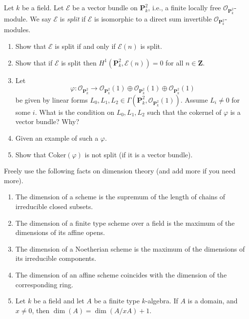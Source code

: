 \begin{exercise}
\label{exercise-nonsplit-vectorbundle}
Let $k$ be a field.
Let $\mathcal{E}$ be a vector bundle on $\mathbf{P}^2_k$, i.e., a finite locally
free $\mathcal{O}_{\mathbf{P}^2_k}$-module.
We say $\mathcal{E}$ is {\it split} if $\mathcal{E}$ is isomorphic to
a direct sum invertible $\mathcal{O}_{\mathbf{P}^2_k}$-modules.
\begin{enumerate}
\item Show that $\mathcal{E}$ is split if and only if $\mathcal{E}(n)$
is split.
\item Show that if $\mathcal{E}$ is split then
$H^1({\mathbf{P}^2_k}, \mathcal{E}(n)) = 0$
for all $n \in \mathbf{Z}$.
\item Let
$$
\varphi :
\mathcal{O}_{\mathbf{P}^2_k}
\longrightarrow
\mathcal{O}_{\mathbf{P}^2_k}(1) \oplus
\mathcal{O}_{\mathbf{P}^2_k}(1) \oplus
\mathcal{O}_{\mathbf{P}^2_k}(1)
$$
be given by linear forms
$L_0, L_1, L_2 \in \Gamma(\mathbf{P}^2_k, \mathcal{O}_{\mathbf{P}^2_k}(1))$.
Assume $L_i \not = 0$ for some $i$.
What is the condition on $L_0, L_1, L_2$ such that
the cokernel of $\varphi$ is a vector bundle?
Why?
\item Given an example of such a $\varphi$.
\item Show that $\text{Coker}(\varphi)$ is not split (if it is
a vector bundle).
\end{enumerate}
\end{exercise}

\begin{remark}
\label{remark-recall-dimension-theory}
Freely use the following facts on dimension theory
(and add more if you need more).
\begin{enumerate}
\item The dimension of a scheme is the supremum of the length of chains
of irreducible closed subsets.
\item The dimension of a finite type scheme over a field is the maximum
of the dimensions of its affine opens.
\item The dimension of a Noetherian scheme is the maximum of the dimensions
of its irreducible components.
\item The dimension of an affine scheme
coincides with the dimension of the corresponding ring. 
\item Let $k$ be a field and let $A$ be a finite type $k$-algebra.
If $A$ is a domain, and $x \not = 0$, then $\dim(A) = \dim(A/xA) + 1$.
\end{enumerate}
\end{remark}

